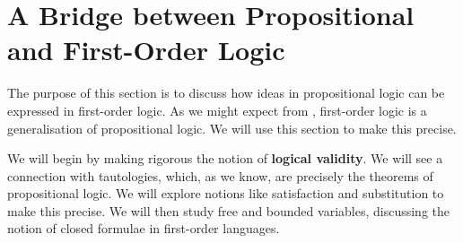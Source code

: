 \section{A Bridge between Propositional and First-Order Logic}

The purpose of this section is to discuss how ideas in propositional logic can be expressed in first-order logic. As we might expect from , first-order logic is a generalisation of propositional logic. We will use this section to make this precise.

We will begin by making rigorous the notion of \textbf{logical validity}. We will see a connection with tautologies, which, as we know, are precisely the theorems of propositional logic. We will explore notions like satisfaction and substitution to make this precise. We will then study free and bounded variables, discussing the notion of closed formulae in first-order languages.

\begin{comment}
\begin{boxexample}
    Let $\L$ have one binary relation. Consider the atomic formula
    \begin{align}
        \parenth{\forall x_1}\parenth{\exists x_2} \Rof{x_1, x_2}
        \label{Ch2:Eq:Forall_Exists_Rel}
    \end{align}
    This formula is true in structures like $\cycl{\N; <}$, $\cycl{\Z, <}$, and $\cycl{\Z, >}$.
\end{boxexample}
\begin{boxnexample}
    Let $\L$ be as above. The formula~\eqref{Ch2:Eq:Forall_Exists_Rel} above is NOT true in $\cycl{\N; >}$, because $0$ does not have a predecessor in $\N$. The reason for this is that relation inputs are \textit{ordered} (ie, relations are not, in general, symmetric).
\end{boxnexample}
\end{comment}
